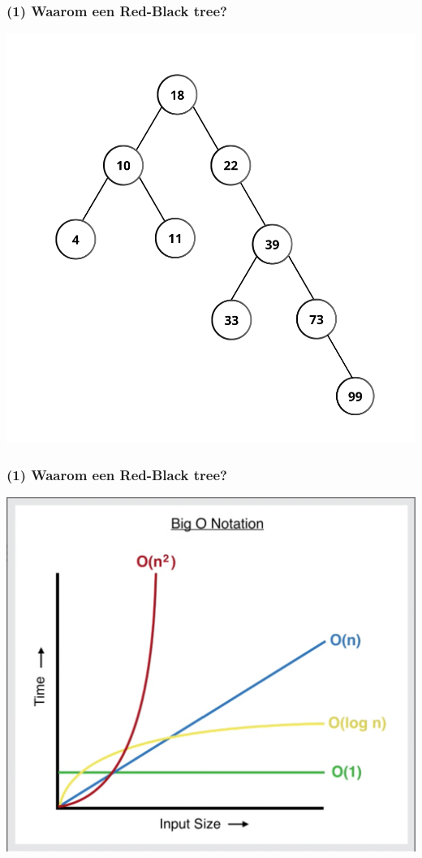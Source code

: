 \documentclass[aspectratio=169,sidebar,dyslexic]{uva-inf-presentation}
\begin{document}
\begin{frame}
\frametitle{(1) Waarom een Red-Black tree?}
\includegraphics[scale=.3]{3.png}
\end{frame}

\begin{frame}
\frametitle{(1) Waarom een Red-Black tree?}
\includegraphics[scale=.18]{time_complexity.png}
\end{frame}
\end{document}

